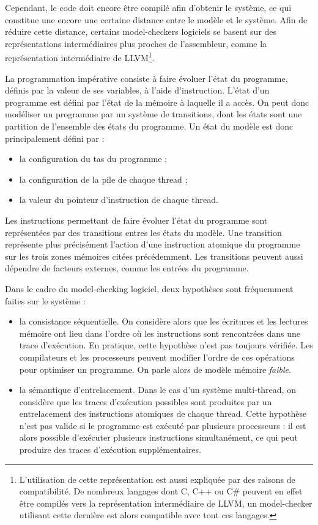 Cependant, le code doit encore être compilé afin d'obtenir le système,
ce qui constitue une encore une certaine distance entre le modèle et le
système. Afin de réduire cette distance, certains
model-checkers logiciels se basent sur des représentations intermédiaires
plus proches de l'assembleur, comme la représentation intermédiaire de
LLVM\footnote{L'utilisation de cette représentation est aussi expliquée
  par des raisons de compatibilité. De nombreux langages dont C, C++ ou
  C\# peuvent en effet être compilés vers la représentation
  intermédiaire de LLVM, un model-checker utilisant cette dernière est
  alors compatible avec tout ces langages.}.

La programmation impérative consiste à faire évoluer l'état du programme,
définis par la valeur de ses variables, à l'aide d'instruction. L'état d'un
programme est défini par l'état de la mémoire à laquelle il a accès. On peut
donc modéliser un programme par un système de transitions, dont les états sont
une partition de l'ensemble des états du programme.
Un état du modèle est donc principalement défini par :

\begin{itemize}
\item
  la configuration du tas du programme ;
\item
  la configuration de la pile de chaque thread ;
\item
  la valeur du pointeur d'instruction de chaque thread.
\end{itemize}

Les instructions permettant de faire évoluer l'état du programme sont
représentées par des transitions entres les états du modèle. Une transition
représente plus précisément l'action d'une instruction atomique du programme sur
les trois zones mémoires citées précédemment. Les transitions peuvent aussi
dépendre de facteurs externes, comme les entrées du programme.

Dans le cadre du model-checking logiciel, deux hypothèses sont fréquemment
faites sur le système :

\begin{itemize}
\item
  la consistance séquentielle. On considère alors que les écritures et
  les lectures mémoire ont lieu dans l'ordre où les instructions sont
  rencontrées dans une trace d'exécution. En pratique, cette hypothèse
  n'est pas toujours vérifiée. Les compilateurs et les processeurs
  peuvent modifier l'ordre de ces opérations pour optimiser un
  programme. On parle alors de modèle mémoire \emph{faible}.
\item
  la sémantique d'entrelacement. Dans le cas d'un système multi-thread,
  on considère que les traces d'exécution possibles sont produites par
  un entrelacement des instructions atomiques de chaque thread. Cette
  hypothèse n'est pas valide si le programme est exécuté par plusieurs
  processeurs : il est alors possible d'exécuter plusieurs instructions
  simultanément, ce qui peut produire des traces d'exécution
  supplémentaires.
\end{itemize}

